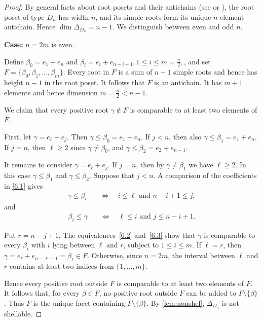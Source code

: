 \documentclass[11pt]{amsart}
\theoremstyle{plain}
\numberwithin{lemma}{\DefaultNumberTheoremWithin}
\numberwithin{theorem}{\DefaultNumberTheoremWithin}
\numberwithin{corollary}{\DefaultNumberTheoremWithin}
\numberwithin{proposition}{\DefaultNumberTheoremWithin}
\numberwithin{conjecture}{\DefaultNumberTheoremWithin}
\theoremstyle{definition}
\numberwithin{definition}{\DefaultNumberTheoremWithin}
\numberwithin{question}{\DefaultNumberTheoremWithin}
\numberwithin{problem}{\DefaultNumberTheoremWithin}
\theoremstyle{remark}
\numberwithin{remark}{\DefaultNumberTheoremWithin}
\numberwithin{example}{\DefaultNumberTheoremWithin}
\numberwithin{claim}{\DefaultNumberTheoremWithin}
\begin{document}
\begin{proof}
By general facts about root posets and their antichains (see \cite{Arm09} or \cite{Rin18}), the root poset of type $D_n$ has width $n$, and its simple roots
form its unique $n$-element antichain. Hence
$
\dim\Delta_{D_n}=n-1.
$
We distinguish between even and odd $n$.

\medskip

\noindent\textbf{Case:} $n=2m$ is even.

Define
$
\beta_0=e_1-e_n
$
and
$
\beta_i=e_i+e_{n-i+1},
 1\leq i\leq m = \frac{n}{2},
$,
and set
$
F=\{\beta_0,\beta_1,\ldots,\beta_m\}.
$
Every root in $F$ is a sum of $n-1$ simple roots and hence has height $n-1$ in the root poset. It follows that $F$ is an antichain.
It has $m+1$ elements and hence dimension $m = \frac{n}{2} <n-1$.

We claim that every positive root $\gamma \notin F$ is comparable to at
least two elements of $F$.

First, let $\gamma=e_\ell-e_j$. Then
$
\gamma\leq\beta_0 = e_1-e_n.
$
If $j<n$, then also
$
\gamma\leq\beta_1=e_1+e_n.
$
If $j=n$, then $\ell \geq 2$ since $\gamma\neq\beta_0$, and
$
\gamma\leq\beta_2=e_2+e_{n-1}.
$

It remains to consider $\gamma=e_\ell+e_j$. If $j=n$, then by 
$\gamma\neq \beta_1$ we have $\ell\geq2$. In this case
$
\gamma\leq\beta_1
$
and
$
\gamma\leq\beta_2.
$
Suppose that $j<n$. A comparison of the coefficients in
\eqref{6.1} gives
\begin{align} \label{6.2}
\gamma\leq\beta_i
\quad & \Longleftrightarrow\quad
i\leq\ell
 \text{ and }
n-i+1\leq j,
\end{align}
and
\begin{align} \label{6.3}
\beta_i\leq\gamma
\quad & \Longleftrightarrow\quad
\ell\leq i
\text{ and }
j\leq n-i+1.
\end{align}

Put $r=n-j+1$. The equivalences~\eqref{6.2} and~\eqref{6.3} show that
$\gamma$ is comparable to every $\beta_i$ with $i$ lying
between $\ell$ and $r$, subject to $1\leq i\leq m$.
If $\ell=r$, then
$
\gamma=e_\ell+e_{n-\ell+1}=\beta_\ell\in F.
$
Otherwise, since $n=2m$, the interval between $\ell$ and $r$
contains at least two indices from $\{1,\ldots,m\}$. 

Hence every
positive root outside $F$ is comparable to at least two elements
of $F$.
It follows that, for every $\beta\in F$, no positive root outside
$F$ can be added to $F\setminus\{\beta\}$. Thus $F$ is the
unique facet containing $F\setminus\{\beta\}$. By
\ref{lem:nonshel}, $\Delta_{D_n}$ is not shellable.


\end{proof}
\end{document}
